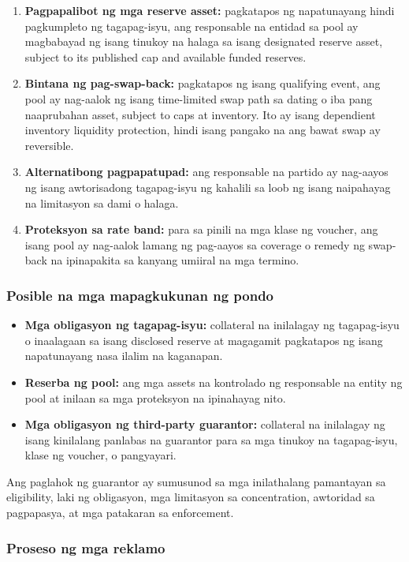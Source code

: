 \documentclass[11pt]{article}
\begin{document}
\begin{enumerate}[leftmargin=*]
\item \textbf{Pagpapalibot ng mga reserve asset:} pagkatapos ng napatunayang hindi pagkumpleto ng tagapag-isyu, ang responsable na entidad sa pool ay magbabayad ng isang tinukoy na halaga sa isang designated reserve asset, subject to its published cap and available funded reserves.
\item \textbf{Bintana ng pag-swap-back:} pagkatapos ng isang qualifying event, ang pool ay nag-aalok ng isang time-limited swap path sa dating o iba pang naaprubahan asset, subject to caps at inventory. Ito ay isang dependient inventory liquidity protection, hindi isang pangako na ang bawat swap ay reversible.
\item \textbf{Alternatibong pagpapatupad:} ang responsable na partido ay nag-aayos ng isang awtorisadong tagapag-isyu ng kahalili sa loob ng isang naipahayag na limitasyon sa dami o halaga.
\item \textbf{Proteksyon sa rate band:} para sa pinili na mga klase ng voucher, ang isang pool ay nag-aalok lamang ng pag-aayos sa coverage o remedy ng swap-back na ipinapakita sa kanyang umiiral na mga termino.
\end{enumerate}
\subsubsection*{Posible na mga mapagkukunan ng pondo}

\begin{itemize}[leftmargin=*]
\item \textbf{Mga obligasyon ng tagapag-isyu:} collateral na inilalagay ng tagapag-isyu o inaalagaan sa isang disclosed reserve at magagamit pagkatapos ng isang napatunayang nasa ilalim na kaganapan.
\item \textbf{Reserba ng pool:} ang mga assets na kontrolado ng responsable na entity ng pool at inilaan sa mga proteksyon na ipinahayag nito.
\item \textbf{Mga obligasyon ng third-party guarantor:} collateral na inilalagay ng isang kinilalang panlabas na guarantor para sa mga tinukoy na tagapag-isyu, klase ng voucher, o pangyayari.
\end{itemize}
Ang paglahok ng guarantor ay sumusunod sa mga inilathalang pamantayan sa eligibility, laki ng obligasyon, mga limitasyon sa concentration, awtoridad sa pagpapasya, at mga patakaran sa enforcement.

\subsubsection*{Proseso ng mga reklamo}
\end{document}
